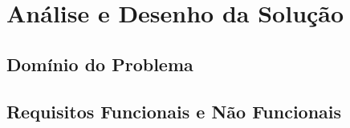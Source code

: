 \chapter{Análise e Desenho da Solução}
\label{cap:analise_desenho}


\section{Domínio do Problema}
\label{sec:domínio_problema}

%
%

\section{Requisitos Funcionais e Não Funcionais}
\label{sec:requisitos}

